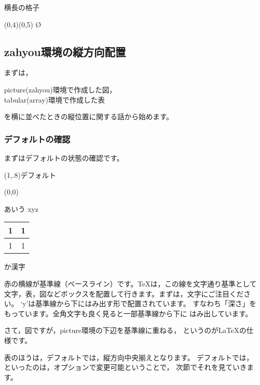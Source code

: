 \begin{showEx}{横長の格子}
\begin{zahyou*}[%
    ul=3mm,xscale=3,%
    yscale=2](0,4)(0,5)%
  \Put\O{}%
\end{zahyou*}%
\end{showEx}

\subsection{\textsf{zahyou}環境の縦方向配置}
\bgroup
\def\kizyunsen{{\color{red}\relax
        \unitlength=1pt\relax
        \begin{picture}(0,0)\relax
          \Drawline{(0,0)(260,0)}%
        \end{picture}}}%
\fboxsep=0pt\relax
まずは，
\begin{jquote}
\textsf{picture(zahyou)}環境で作成した図，\\
\textsf{tabular(array)}環境で作成した表
\end{jquote}
を横に並べたときの縦位置に関する話から始めます。

\subsubsection{デフォルトの確認}
まずはデフォルトの状態の確認です。

\begin{showEx}(1,.8){デフォルト}
\kizyunsen
あいう%
%
xyz%
\begin{tabular}{|c|c|}\hline
  1 & 1 \\\hline
  1 & 1 \\\hline
\end{tabular}%
か漢字%
\end{showEx}

赤の横線が基準線（ベースライン）です。\TeX は，この線を文字通り基準として
文字，表，図などボックスを配置して行きます。まずは，文字にご注目ください。
`y'は基準線から下にはみ出す形で配置されています。
すなわち「深さ」をもっています。全角文字も良く見ると一部基準線から下に
はみ出しています。

さて，図ですが，\textsf{picture}環境の下辺を基準線に重ねる，
というのが\LaTeX の仕様です。

表のほうは，デフォルトでは，縦方向中央揃えとなります。
デフォルトでは，といったのは，オプションで変更可能ということで，
次節でそれを見ていきます。

